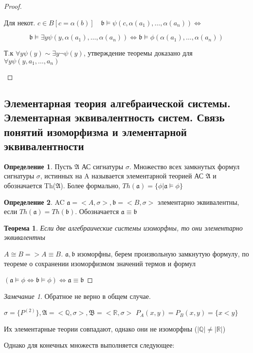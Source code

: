 \documentclass[a4paper]{article}
\newtheorem{theorem}{Теорема}[section]
\theoremstyle{definition}
\newtheorem*{definition}{Определение}
\theoremstyle{remark}
\newtheorem*{remark}{Замечание}
\begin{document}
\begin{proof}
\begin{enumerate}
\begin{enumerate}
                Для некот. $c\in B [c = \alpha(b)]\quad \mathfrak{b}\models \psi(c, \alpha(a_1), \dots, \alpha(a_n))\Leftrightarrow$

                $$\mathfrak{b}\models \exists y \psi(y, \alpha(a_1), \dots, \alpha(a_n))\Leftrightarrow \mathfrak{b}\models \phi(\alpha(a_1), \dots, \alpha(a_n))$$

                Т.к $\forall y \psi (y)\sim \exists y \neg \psi(y)$, утверждение теоремы доказано для $\forall y \psi(y, a_1, \dots, a_n)$
            \end{enumerate}
        \end{enumerate}
    \end{proof}
    \subsection{Элементарная теория алгебраической системы. Элементарная эквивалентность систем. Связь понятий изоморфизма и элементарной эквивалентности}
    \begin{definition}
        Пусть $\mathfrak{A}$ АС сигнатуры $\sigma$. Множество всех замкнутых формул
        сигнатуры $\sigma$, истинных на A называется элементарной теорией АС $\mathfrak{A}$ и обозначается Th($\mathfrak{A}$).
        Более формально,
        $Th(\mathfrak{a}) = \{\phi|\mathfrak{a} \models \phi\}$
    \end{definition}
    \begin{definition}
        AC $\mathfrak{a} = <A, \sigma>, \mathfrak{b} = <B, \sigma>$ элементарно эквивалентны, если
        $Th(\mathfrak{a}) = Th(\mathfrak{b})$. Обозначается $\mathfrak{a}\equiv \mathfrak{b}$
    \end{definition}
    \begin{theorem}
        Если две алгебраические системы изоморфны, то они элементарно эквивалентны
    \end{theorem}
    \begin{proof}[$A\cong B => A\equiv B$]
        $\mathfrak{a}, \mathfrak{b}$ изоморфны, берем произвольную замкнутую формулу, по теореме о сохранении изоморфизмом значений термов и формул

        $(\mathfrak{a}\models \phi \Leftrightarrow \mathfrak{b}\models \phi) \Leftrightarrow \mathfrak{a} \equiv \mathfrak{b}$
    \end{proof}
    \begin{remark}
        Обратное не верно в общем случае.
        
        $\sigma = \{P^{(2)}\}, \mathfrak{A} = <\mathbb{Q}, \sigma>, \mathfrak{B} = <\mathbb{R}, \sigma>$
        $P_A(x, y) = P_B(x, y) = \{x < y\}$

        Их элементарные теории совпадают, однако они не изоморфны ($|\mathbb{Q} |\neq |\mathbb{R} |$)

        Однако для конечных множеств выполняется следующее:
    \end{remark}
\end{document}
